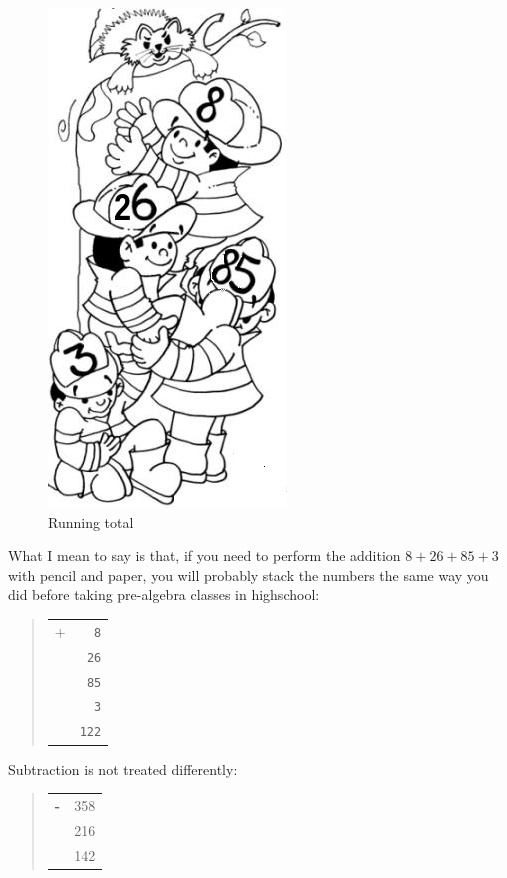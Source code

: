 \documentclass[a4paper,12pt]{book}
\begin{document}
\begin{figure}
	\renewcommand\figurename{Fig.}
	\includegraphics[scale=0.5]{figs-prefix/firemen.png}
	\caption{Running total}
\end{figure}
What I mean to say is that, if you
need to perform the addition
$8 + 26 + 85 + 3$ with pencil and paper,
you will probably stack the numbers the
same way you did before taking pre-algebra
classes in highschool:
\begin{quote}
	\begin{tabular}{p{0.5cm}p{1cm}}
		+ &\verb|  8|\\
		&\verb| 26|\\
		&\verb| 85|\\
		&\verb|  3|\\
		\hline
		&\verb|122|
	\end{tabular}
\end{quote}
Subtraction is not treated differently:
\begin{quote}
	\begin{tabular}{p{0.5cm}p{1.5cm}}
		\Large\bf -&   358\\
		&   216\\
		\hline
		& 142
	\end{tabular}
\end{quote}
\end{document}
